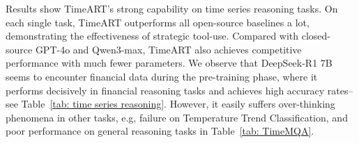 \begin{table}[!htbp]
    \centering
    \caption{Accuracy rates on tasks in TimeMQA. Higher values indicate better performance. : the best, : the second best. }
    \label{tab: TimeMQA}
\end{table}

Results show TimeART's strong capability on time series reasoning tasks. On each single task, TimeART outperforms all open-source baselines a lot, demonstrating the effectiveness of strategic tool-use. Compared with closed-source GPT-4o and Qwen3-max, TimeART also achieves competitive performance with much fewer parameters. We observe that DeepSeek-R1 7B seems to encounter financial data during the pre-training phase, where it performs decisively in financial reasoning tasks and achieves high accuracy rates--see Table~\ref{tab: time series reasoning}. However, it easily suffers over-thinking phenomena in other tasks, e.g, failure on Temperature Trend Classification, and poor performance on general reasoning tasks in Table~\ref{tab: TimeMQA}.

